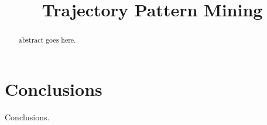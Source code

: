 \documentclass[conference]{IEEEtran}
\newcommand{\eat}[1]{}
\newcommand{\stitle}[1]{\vspace{0.5ex}\noindent{\bf #1}}
\begin{document}
\title{Trajectory Pattern Mining}


\author{}


\maketitle

\begin{abstract}
abstract goes here.
\end{abstract}








\section{Conclusions}
\label{sec-conc}
Conclusions.


\eat{%
\begin{acks}
This work is supported in part by  973 program ({\small No. 2014CB340300}), NSFC ({\small No. 61322207\&61421003}),  Special Funds of Beijing Municipal Science \& Technology Commission, and MSRA Collaborative Research Program.
\end{acks}
}%



\begin{small}

\end{small}



\end{document}
